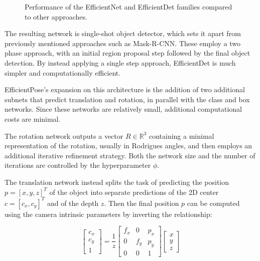 \begin{figure}[htp]
    

    \caption{Performance of the EfficientNet and EfficientDet families compared to other approaches.}
\end{figure}

The resulting network is single-shot object detector, which sets it apart from previously mentioned approaches such as Mask-R-CNN. These employ a two phase approach, with an initial region proposal step followed by the final object detection. By instead applying a single step approach, EfficientDet is much simpler and computationally efficient.

EfficientPose's expansion on this architecture is the addition of two additional subnets that predict translation and rotation, in parallel with the class and box networks. Since these networks are relatively small, additional computational costs are minimal.

The rotation network outputs a vector $R \in \mathbb{R}^3$ containing a minimal representation of the rotation, usually in Rodrigues angles, and then employs an additional iterative refinement strategy. Both the network size and the number of iterations are controlled by the hyperparameter $\phi$.

The translation network instead splits the task of predicting the position $p=[x, y, z]^T$ of the object into separate predictions of the 2D center $c = [c_x, c_y]^T$ and of the depth $z$. Then the final position $p$ can be computed using the camera intrinsic parameters by inverting the relationship:

\begin{equation}
    \begin{bmatrix}
        c_x\\c_y\\1
    \end{bmatrix}
    = \frac{1}{z}
    \begin{bmatrix}
        f_x & 0 & p_x \\
        0 & f_y & p_y \\
        0 & 0 & 1 
    \end{bmatrix}
    \begin{bmatrix}
        x\\y\\z
    \end{bmatrix}
\end{equation}


